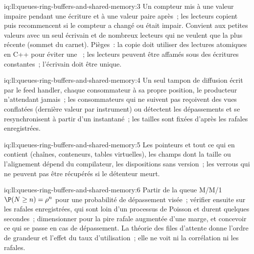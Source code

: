\begin{solution}{iq:ll:queues-ring-buffers-and-shared-memory:3}
Un compteur mis à une valeur impaire pendant une écriture et à une valeur paire après~; les lecteurs copient puis recommencent si le compteur a changé ou était impair. Convient aux petites valeurs
avec un seul écrivain et de nombreux lecteurs qui ne veulent que la plus récente (sommet du carnet). Pièges~: la copie doit utiliser des lectures atomiques en C++ pour éviter une ~; les lecteurs peuvent être affamés sous des écritures constantes~; l'écrivain doit être unique.
\end{solution}

\begin{solution}{iq:ll:queues-ring-buffers-and-shared-memory:4}
Un seul tampon de diffusion écrit par le feed handler, chaque consommateur à sa propre position, le producteur n'attendant jamais~; les consommateurs qui
ne suivent pas reçoivent des vues conflatées (dernière valeur par instrument) ou détectent les dépassements et se resynchronisent à partir d'un instantané~; les tailles sont fixées
d'après les rafales enregistrées.
\end{solution}

\begin{solution}{iq:ll:queues-ring-buffers-and-shared-memory:5}
Les pointeurs et tout ce qui en contient (chaînes, conteneurs, tables virtuelles), les champs dont la taille ou l'alignement dépend du
compilateur, les dispositions sans version~; les verrous qui ne peuvent pas être récupérés si le détenteur meurt.
\end{solution}

\begin{solution}{iq:ll:queues-ring-buffers-and-shared-memory:6}
Partir de la queue M/M/1 $\P(N \ge n) = \rho^n$ pour une probabilité de dépassement visée~; vérifier ensuite sur les rafales enregistrées, qui sont loin
d'un processus de Poisson et durent quelques secondes~; dimensionner pour la pire rafale augmentée d'une marge, et concevoir ce qui se passe en cas de dépassement. La théorie des files d'attente donne
l'ordre de grandeur et l'effet du taux d'utilisation~; elle ne voit ni la corrélation ni les rafales.
\end{solution}
